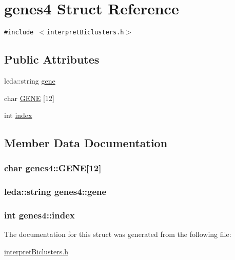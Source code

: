 \hypertarget{structgenes4}{
\section{genes4 Struct Reference}
\label{structgenes4}
}
{\tt \#include $<$interpretBiclusters.h$>$}

\subsection*{Public Attributes}
\begin{CompactItemize}
\item 
leda::string \hyperlink{structgenes4_ab0c2ecf7f682d86b43d07733fff856e}{gene}
\item 
char \hyperlink{structgenes4_e6d820a98bb1f0915772b142330a9fcb}{GENE} \mbox{[}12\mbox{]}
\item 
int \hyperlink{structgenes4_7e820b5ee85533fb2e8cdf5f4b4539e3}{index}
\end{CompactItemize}


\subsection{Member Data Documentation}
\hypertarget{structgenes4_e6d820a98bb1f0915772b142330a9fcb}{
\subsubsection[{GENE}]{\setlength{\rightskip}{0pt plus 5cm}char {\bf genes4::GENE}\mbox{[}12\mbox{]}}}
\label{structgenes4_e6d820a98bb1f0915772b142330a9fcb}


\hypertarget{structgenes4_ab0c2ecf7f682d86b43d07733fff856e}{
\subsubsection[{gene}]{\setlength{\rightskip}{0pt plus 5cm}leda::string {\bf genes4::gene}}}
\label{structgenes4_ab0c2ecf7f682d86b43d07733fff856e}


\hypertarget{structgenes4_7e820b5ee85533fb2e8cdf5f4b4539e3}{
\subsubsection[{index}]{\setlength{\rightskip}{0pt plus 5cm}int {\bf genes4::index}}}
\label{structgenes4_7e820b5ee85533fb2e8cdf5f4b4539e3}




The documentation for this struct was generated from the following file:\begin{CompactItemize}
\item 
\hyperlink{interpretBiclusters_8h}{interpretBiclusters.h}\end{CompactItemize}
